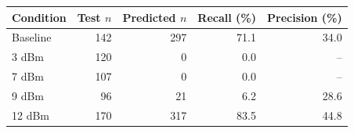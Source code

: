 \begin{tabular}{lrrrr}
\toprule
Condition & Test $n$ & Predicted $n$ & Recall (\%) & Precision (\%) \\
\midrule
Baseline & 142 & 297 & 71.1 & 34.0 \\
3 dBm & 120 & 0 & 0.0 & -- \\
7 dBm & 107 & 0 & 0.0 & -- \\
9 dBm & 96 & 21 & 6.2 & 28.6 \\
12 dBm & 170 & 317 & 83.5 & 44.8 \\
\bottomrule
\end{tabular}
